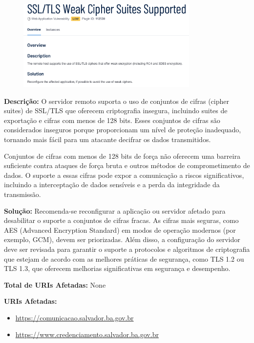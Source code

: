 \documentclass[a4paper,12pt]{article}
\begin{document}
\begin{enumerate}
                        \begin{figure}[h!]
                        \centering
                        \includegraphics[width=0.8\textwidth]{assets/images-was/Protocolos e Cifragem/SSL-TLS Weak Cipher Suites Supported.png}
                        \end{figure}
                        \FloatBarrier
                        \textbf{Descrição:} O servidor remoto suporta o uso de conjuntos de cifras (cipher suites) de SSL/TLS que oferecem criptografia insegura, incluindo suites de exportação e cifras com menos de 128 bits. Esses conjuntos de cifras são considerados inseguros porque proporcionam um nível de proteção inadequado, tornando mais fácil para um atacante decifrar os dados transmitidos.

    Conjuntos de cifras com menos de 128 bits de força não oferecem uma barreira suficiente contra ataques de força bruta e outros métodos de comprometimento de dados. O suporte a essas cifras pode expor a comunicação a riscos significativos, incluindo a interceptação de dados sensíveis e a perda da integridade da transmissão.

\textbf{Solução:} Recomenda-se reconfigurar a aplicação ou servidor afetado para desabilitar o suporte a conjuntos de cifras fracas. As cifras mais seguras, como AES (Advanced Encryption Standard) em modos de operação modernos (por exemplo, GCM), devem ser priorizadas. Além disso, a configuração do servidor deve ser revisada para garantir o suporte a protocolos e algoritmos de criptografia que estejam de acordo com as melhores práticas de segurança, como TLS 1.2 ou TLS 1.3, que oferecem melhorias significativas em segurança e desempenho.

\textbf{Total de URIs Afetadas:} None

\textbf{URIs Afetadas:}
\begin{itemize}
    \item \url{https://comunicacao.salvador.ba.gov.br}
    \item \url{https://www.credenciamento.salvador.ba.gov.br}
\end{itemize}

\end{enumerate}
\end{document}
